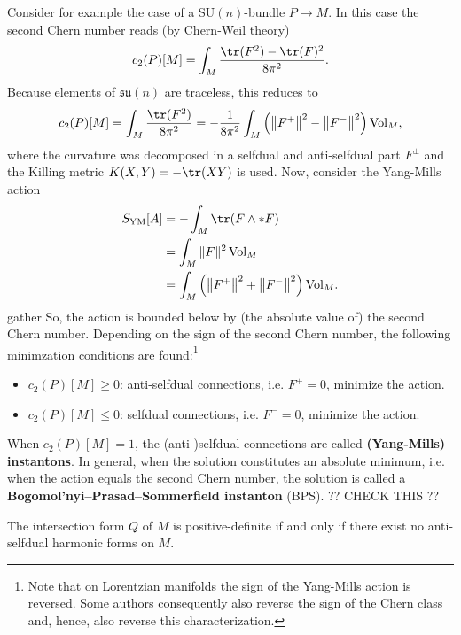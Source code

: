     Consider for example the case of a $\mathrm{SU}(n)$-bundle $P\rightarrow M$. In this case the second Chern number reads (by Chern-Weil theory)
    \begin{gather}
        c_2(P)[M] = \int_M\frac{\tr(F^2)-\tr(F)^2}{8\pi^2}.
    \end{gather}
    Because elements of $\mathfrak{su}(n)$ are traceless, this reduces to
    \begin{gather}
        c_2(P)[M] = \int_M\frac{\tr(F^2)}{8\pi^2}=-\frac{1}{8\pi^2}\int_M\left(\left\|F^+\right\|^2-\left\|F^-\right\|^2\right)\mathrm{Vol}_M,
    \end{gather}
    where the curvature was decomposed in a selfdual and anti-selfdual part $F^\pm$ and the Killing metric $K(X,Y)=-\tr(XY)$ is used. Now, consider the Yang-Mills action
    \begin{align*}
        S_\mathrm{YM}[A] &= -\int_M\tr(F\wedge\ast F)\\
        &= \int_M\|F\|^2\,\mathrm{Vol}_M\\
        &= \int_M\left(\left\|F^+\right\|^2+\left\|F^-\right\|^2\right)\mathrm{Vol}_M.
    \end{align*}{gather}
    So, the action is bounded below by (the absolute value of) the second Chern number. Depending on the sign of the second Chern number, the following minimzation conditions are found:\footnote{Note that on Lorentzian manifolds the sign of the Yang-Mills action is reversed. Some authors consequently also reverse the sign of the Chern class and, hence, also reverse this characterization.}
    \begin{itemize}
        \item $c_2(P)[M]\geq0$: anti-selfdual connections, i.e. $F^+=0$, minimize the action.
        \item $c_2(P)[M]\leq0$: selfdual connections, i.e. $F^-=0$, minimize the action.
    \end{itemize}
    When $c_2(P)[M]=1$, the (anti-)selfdual connections are called \textbf{(Yang-Mills) instantons}. In general, when the solution constitutes an absolute minimum, i.e. when the action equals the second Chern number, the solution is called a \textbf{Bogomol'nyi–Prasad–Sommerfield instanton} (BPS).  ?? CHECK THIS ??

    \begin{property}
        The intersection form $Q$ of $M$ is positive-definite if and only if there exist no anti-selfdual harmonic forms on $M$.
    \end{property}

